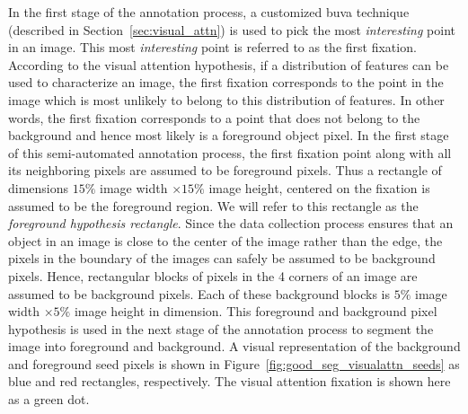 \documentclass {udthesis}
\begin{document}
In the first stage of the annotation process, a customized \gls{buva} technique (described in Section~\ref{sec:visual_attn}) is used to pick the most \textit{interesting} point in an image. This most \textit{interesting} point is referred to as the first fixation. According to the visual attention hypothesis, if a distribution of features can be used to characterize an image, the first fixation corresponds to the point in the image which is most unlikely to belong to this distribution of features. In other words, the first fixation corresponds to a point that does not belong to the background and hence most likely is a foreground object pixel. In the first stage of this semi-automated annotation process, the first fixation point along with all its neighboring pixels are assumed to be foreground pixels. Thus a rectangle of dimensions $15\%$ image width $\times 15\%$ image height, centered on the fixation is assumed to be the foreground region. We will refer to this rectangle as the \textit{foreground 
hypothesis rectangle}.
Since the data collection  process ensures that an object in an image is close to the center of the image rather than the edge, the pixels in the boundary of the images can safely be assumed to be background pixels. Hence, rectangular blocks of pixels in the 4 corners of an image are assumed to be background pixels. Each of these background blocks is $5\%$ image width $\times 5\%$ image height in dimension. This foreground and background pixel hypothesis is used in the next stage of the annotation process to segment the image into foreground and background. A visual representation of the background and foreground seed pixels is shown in Figure~\ref{fig:good_seg_visualattn_seeds} as blue and red rectangles, respectively. The visual attention fixation is shown here as a green dot.
\end{document}
